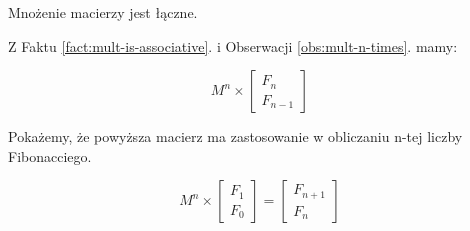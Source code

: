 \begin{fact}{Mnożenie macierzy jest łączne.}
\label{fact:mult-is-associative}
\end{fact}

Z Faktu \ref{fact:mult-is-associative}. i Obserwacji \ref{obs:mult-n-times}. mamy:

\begin{equation}
	M^n \times \begin{bmatrix}F_n \\ F_{n - 1}\end{bmatrix}
\end{equation}

Pokażemy, że powyższa macierz ma zastosowanie w obliczaniu n-tej liczby Fibonacciego.

\begin{lemma}
\begin{equation}
	M^{n} \times \begin{bmatrix}F_1 \\ F_0\end{bmatrix} = \begin{bmatrix}F_{n + 1} \\ F_{n}\end{bmatrix}
\end{equation}
\end{lemma}

